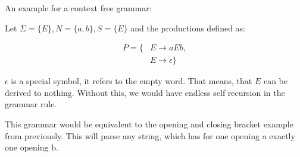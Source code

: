 An example for a context free grammar:

Let $\Sigma = \{E\}, N = \{a, b\}, S = \{E\}$ and the productions defined as:

\begin{align*}
P = \{&E \to a E b,\\
&E \to \epsilon\}
\end{align*}

$\epsilon$ is a special symbol, it refers to the empty word. That means, that $E$ can be derived to nothing. Without this, we would have endless self recursion in the grammar rule.

This grammar would be equivalent to the opening and closing bracket example from previously. This will parse any string, which has for one opening a exactly one opening b.
